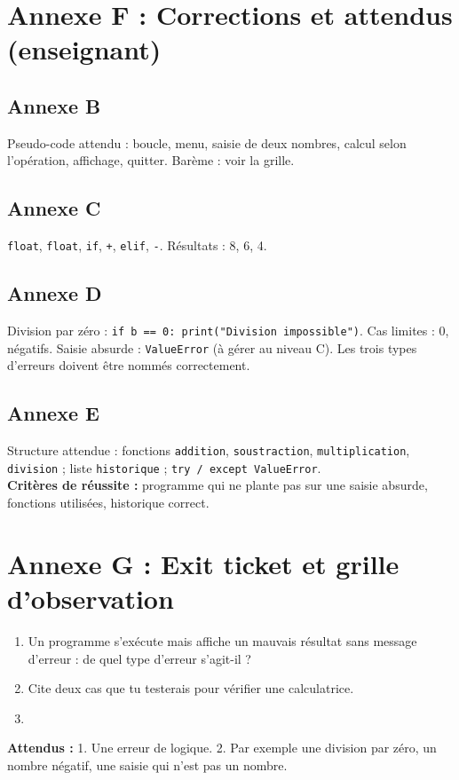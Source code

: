 \documentclass[11pt,a4paper]{article}
\begin{document}
\section*{Annexe F : Corrections et attendus (enseignant)}

\subsection*{Annexe B}
Pseudo-code attendu : boucle, menu, saisie de deux nombres, calcul selon l'opération, affichage, quitter. Barème : voir la grille.

\subsection*{Annexe C}
\texttt{float}, \texttt{float}, \texttt{if}, \texttt{+}, \texttt{elif}, \texttt{-}. Résultats : 8, 6, 4.

\subsection*{Annexe D}
Division par zéro : \texttt{if b == 0: print("Division impossible")}. Cas limites : 0, négatifs. Saisie absurde : \texttt{ValueError} (à gérer au niveau C). Les trois types d'erreurs doivent être nommés correctement.

\subsection*{Annexe E}
Structure attendue : fonctions \texttt{addition}, \texttt{soustraction}, \texttt{multiplication}, \texttt{division} ; liste \texttt{historique} ; \texttt{try / except ValueError}.\\
\textbf{Critères de réussite :} programme qui ne plante pas sur une saisie absurde, fonctions utilisées, historique correct.

\newpage
\section*{Annexe G : Exit ticket et grille d'observation}

\begin{enumerate}
 \item Un programme s'exécute mais affiche un mauvais résultat sans message d'erreur : de quel type d'erreur s'agit-il ?\\ \lig
 \item Cite deux cas que tu testerais pour vérifier une calculatrice.\\ \lig
 \item \autoeval
\end{enumerate}
\textbf{Attendus :} 1. Une erreur de logique. 2. Par exemple une division par zéro, un nombre négatif, une saisie qui n'est pas un nombre.

\bigskip
{}
\end{document}
